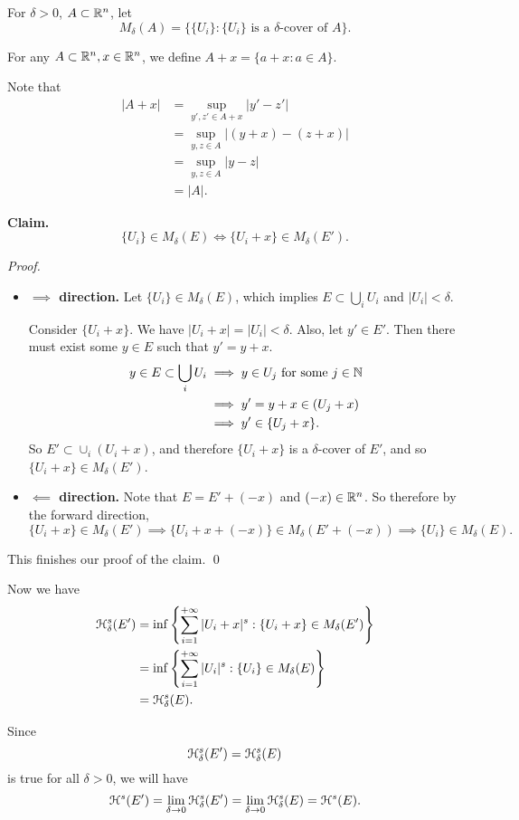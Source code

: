 For \(\delta > 0\), \(A \subset \mathbb{R}^n\), let
\[
M_\delta(A) = \{\{U_i\} : \{U_i\} \text{ is a } \delta\text{-cover of } A\}.
\]

For any \(A \subset \mathbb{R}^n, x \in \mathbb{R}^n\), we define \(A + x = \{a + x: a \in A\}\).

Note that
\begin{align*}
    |A + x| &= \sup_{y', z' \in A + x} |y' - z'|\\
    &= \sup_{y, z \in A} |(y + x) - (z + x)|\\
    &= \sup_{y, z \in A} |y - z|\\
    &= |A|.
\end{align*}

\textbf{Claim.}
\[
\{U_i\} \in M_{\delta}(E) \iff \{U_i + x\} \in M_{\delta}(E').
\]

\textit{Proof.}
\begin{itemize}
    \item \textbf{\(\implies\) direction.} Let \(\{U_i\} \in M_{\delta}(E)\), which implies \(E \subset \bigcup_i U_i\) and \(|U_i| < \delta\).

    Consider \(\{U_i + x\}\). We have \(|U_i + x| = |U_i| < \delta\). Also, let \(y' \in E'\). Then there must exist some \(y \in E\) such that \(y' = y + x\).
    \begin{align*}
        y \in E \subset \bigcup_i U_i &\implies y \in U_j \text{ for some } j \in \mathbb{N}\\
        &\implies y' = y + x \in \left(U_j + x\right)\\
        &\implies y' \in \{U_j + x\}.
    \end{align*}
    So \(E' \subset\cup_i (U_i + x)\), and therefore \(\{U_i + x\}\) is a \(\delta\)-cover of \(E'\), and so \(\{U_i + x\} \in M_{\delta}(E')\).
    \item \textbf{\(\impliedby\) direction.} Note that \(E = E' + (-x)\) and \((-x) \in \mathbb{R}^n\). So therefore by the forward direction,
    \[
        \{U_i + x\} \in M_{\delta}(E') \implies \{U_i + x + (-x)\} \in M_{\delta} (E' + (-x)) \implies \{U_i\} \in M_{\delta}(E).
    \]
\end{itemize}
This finishes our proof of the claim. \qed

Now we have
\begin{align*}
    \mathcal{H}_{\delta}^s (E') &= \inf\left\{\sum_{i = 1}^{+\infty} |U_i + x|^s : \{U_i + x\} \in M_{\delta} (E')\right\}\\
    &= \inf\left\{\sum_{i = 1}^{+\infty} |U_i|^s : \{U_i\} \in M_{\delta} (E)\right\}\\
    &= \mathcal{H}_{\delta}^s (E).
\end{align*}

Since \[\mathcal{H}_{\delta}^s (E') = \mathcal{H}_{\delta}^s (E)\] is true for all \(\delta > 0\), we will have
\[\mathcal{H}^s(E') = \lim_{\delta \to 0} \mathcal{H}_{\delta}^s (E') = \lim_{\delta \to 0} \mathcal{H}_{\delta}^s (E) = \mathcal{H}^s(E).\]